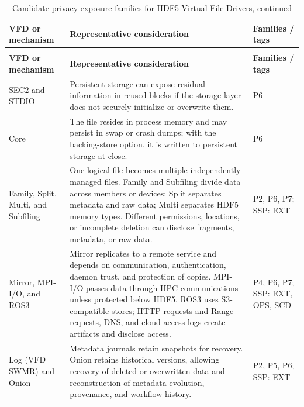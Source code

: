 \documentclass[../main.tex]{subfiles}
\begin{document}
\begingroup
\small
\setlength{\tabcolsep}{3pt}
\renewcommand{\arraystretch}{1.12}
\begin{longtable}{@{}p{}p{}p{}@{}}
\caption{Candidate privacy-exposure families for HDF5 Virtual File Drivers}
\label{tab:vfd-privacy-risks}\\
\hline
\textbf{VFD or mechanism} & \textbf{Representative consideration} &
\textbf{Families / tags} \\
\hline
\endfirsthead
\caption[]{Candidate privacy-exposure families for HDF5 Virtual File Drivers, continued}\\
\hline
\textbf{VFD or mechanism} & \textbf{Representative consideration} &
\textbf{Families / tags} \\
\hline
\endhead
\hline
\endfoot

SEC2 and STDIO &
Persistent storage can expose residual information in reused blocks if the
storage layer does not securely initialize or overwrite them. &
P6 \\
\hline

Core &
The file resides in process memory and may persist in swap or crash dumps; with
the backing-store option, it is written to persistent storage at close. &
P6 \\
\hline

Family, Split, Multi, and Subfiling &
One logical file becomes multiple independently managed files. Family and
Subfiling divide data across members or devices; Split separates metadata and
raw data; Multi separates HDF5 memory types. Different permissions, locations,
or incomplete deletion can disclose fragments, metadata, or raw data. &
P2, P6, P7; SSP: EXT \\
\hline

Mirror, MPI-I/O, and ROS3 &
Mirror replicates to a remote service and depends on communication,
authentication, daemon trust, and protection of copies. MPI-I/O passes data
through HPC communications unless protected below HDF5. ROS3 uses
S3-compatible stores; HTTP requests and Range requests, DNS, and cloud access
logs create artifacts and disclose access. &
P4, P6, P7; SSP: EXT, OPS, SCD \\
\hline

Log (VFD SWMR) and Onion &
Metadata journals retain snapshots for recovery. Onion retains historical
versions, allowing recovery of deleted or overwritten data and reconstruction
of metadata evolution, provenance, and workflow history. &
P2, P5, P6; SSP: EXT \\
\hline


\end{longtable}
\end{document}
